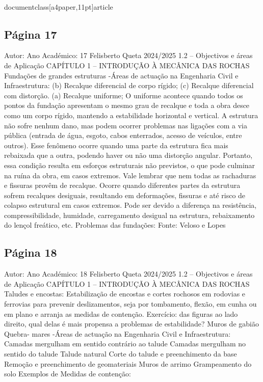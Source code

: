 \\documentclass[a4paper,11pt]{article}
\begin{document}
\subsection*{Página 17}
Autor:
Ano Académico:
17
Felisberto Queta
2024/2025
1.2 – Objectivos e áreas de Aplicação
CAPÍTULO 1 – INTRODUÇÃO À MECÂNICA DAS ROCHAS
Fundações de grandes estruturas
-Áreas de actuação na Engenharia Civil e Infraestrutura:
(b) Recalque diferencial de corpo 
rígido; 
(c) Recalque diferencial com 
distorção. 
(a) Recalque uniforme; 
O uniforme acontece quando todos os 
pontos da fundação apresentam o mesmo 
grau de recalque e toda a obra desce como 
um corpo rígido, mantendo a estabilidade 
horizontal e vertical. A estrutura não sofre 
nenhum dano, mas podem ocorrer problemas 
nas ligações com a via pública (entrada de 
água, esgoto, cabos enterrados, acesso de 
veículos, entre outros).
Esse fenômeno ocorre quando uma 
parte da estrutura fica mais rebaixada 
que a outra, podendo haver ou não uma 
distorção angular. Portanto, essa 
condição resulta em esforços estruturais 
não previstos, o que pode culminar na 
ruína da obra, em casos extremos. Vale 
lembrar que nem todas as rachaduras e 
fissuras provêm de recalque.
Ocorre quando diferentes partes da 
estrutura sofrem recalques desiguais, 
resultando em deformações, fissuras e 
até risco de colapso estrutural em 
casos extremos. Pode ser devido a 
diferença na resistência, 
compressibilidade, humidade, 
carregamento desigual na estrutura, 
rebaixamento do lençol freático, etc. 
Problemas das fundações:
Fonte: Veloso 
e Lopes



\subsection*{Página 18}
Autor:
Ano Académico:
18
Felisberto Queta
2024/2025
1.2 – Objectivos e áreas de Aplicação
CAPÍTULO 1 – INTRODUÇÃO À MECÂNICA DAS ROCHAS
Taludes e encostas:
Estabilização de encostas e cortes rochosos em rodovias e ferrovias para prevenir
deslizamentos, seja por tombamento, flexão, em cunha ou em plano e arranja as medidas de
contenção.
Exercício: das figuras ao lado direito,
qual delas é mais propensa a problemas
de estabilidade?
Muros
de
gabião
Quebra-
mares
-Áreas de actuação na Engenharia Civil e Infraestrutura:
Camadas
mergulham
em
sentido contrário ao talude
Camadas
mergulham
no
sentido do talude
Talude natural
Corte
do
talude
e
preenchimento da base
Remoção e preenchimento
de geomateriais
Muros
de
arrimo
Grampeamento
do solo
Exemplos
de
Medidas
de
contenção:
\end{document}
